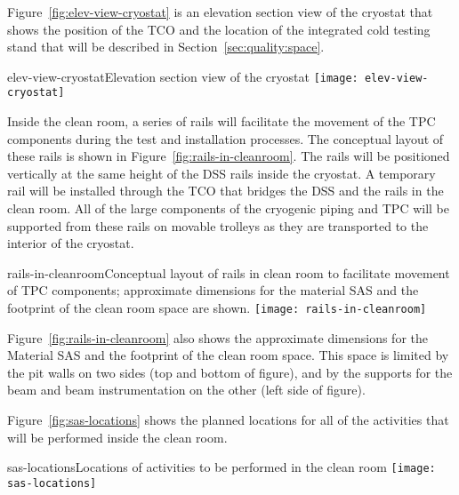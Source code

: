 Figure~\ref{fig:elev-view-cryostat} is an elevation section view of the cryostat that shows the position of the TCO and the location of the integrated cold testing stand that will be described in Section~\ref{sec:quality:space}.  

\begin{cdrfigure}{elev-view-cryostat}{Elevation section view of the cryostat}
\texttt{[image: elev-view-cryostat]}
\end{cdrfigure}

Inside the clean room, a series of rails will facilitate the movement of the TPC components during the test and installation processes.  The conceptual layout of these rails is shown in Figure~\ref{fig:rails-in-cleanroom}.  The rails will be positioned vertically at the same height of the DSS rails inside the cryostat.  A temporary rail will be installed through the TCO that bridges the DSS and the rails in the clean room.  All of the large components of the cryogenic piping and TPC will be supported from these rails on movable trolleys as they are transported to the interior of the cryostat.  

\begin{cdrfigure}{rails-in-cleanroom}{Conceptual layout of rails in clean room to facilitate movement of TPC components; approximate dimensions for the material SAS and the footprint of the clean room space are shown.}
\texttt{[image: rails-in-cleanroom]}
\end{cdrfigure}


Figure~\ref{fig:rails-in-cleanroom} also shows the approximate dimensions for the Material SAS and the footprint of the clean room space.  This space is 
 limited by the pit walls on two sides (top and bottom of figure), and by the supports for the beam and beam instrumentation on the other  (left side of figure).  

Figure~\ref{fig:sas-locations} shows the planned locations for all of the activities that will be performed inside the clean room.  

\begin{cdrfigure}{sas-locations}{Locations of activities to be performed in the clean room}
\texttt{[image: sas-locations]}
\end{cdrfigure}


